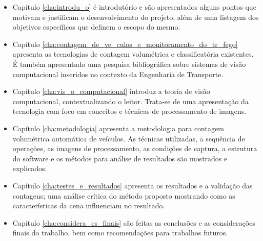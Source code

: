 \begin{itemize}
  \item Capítulo \ref{cha:introdu_o} é introdutório e são apresentados alguns pontos que motivam e justificam o desenvolvimento do projeto, além de uma listagem dos objetivos específicos que definem o escopo do mesmo.
  \item Capítulo \ref{cha:contagem_de_ve_culos_e_monitoramento_do_tr_fego} apresenta as tecnologias de contagem volumétrica e classificatória existentes. É também apresentado uma pesquisa bibliográfica sobre sistemas de visão computacional inseridos no contexto da Engenharia de Transporte.
  \item Capítulo \ref{cha:vis_o_computacional} introduz a teoria de visão computacional, contextualizando o leitor. Trata-se de uma apresentação da tecnologia com foco em conceitos e técnicas de processamento de imagens.
  \item Capítulo \ref{cha:metodologia} apresenta a metodologia para contagem volumétrica automática de veículos. As técnicas utilizadas, a sequência de operações, as imagens de processamento, as condições de captura, a estrutura do software e os métodos para análise de resultados são mostrados e explicados. 
  \item Capítulo \ref{cha:testes_e_resultados} apresenta os resultados e a validação das contagens; uma análise crítica do método proposto mostrando como as características da cena influenciam no resultado. 
  \item Capítulo \ref{cha:considera_es_finais} são feitas as conclusões e as considerações finais do trabalho, bem como recomendações para trabalhos futuros.
\end{itemize}


